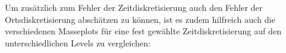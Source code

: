 \begin{figure}[H]
	\centering
\end{figure}

Um zusätzlich zum Fehler der Zeitdiskretisierung auch den Fehler der Ortsdiskretisierung abschätzen zu können, ist es zudem hilfreich auch die verschiedenen Masseplots für eine fest gewählte Zeitdiskretisierung auf den unterschiedlichen Levels zu vergleichen:
 
